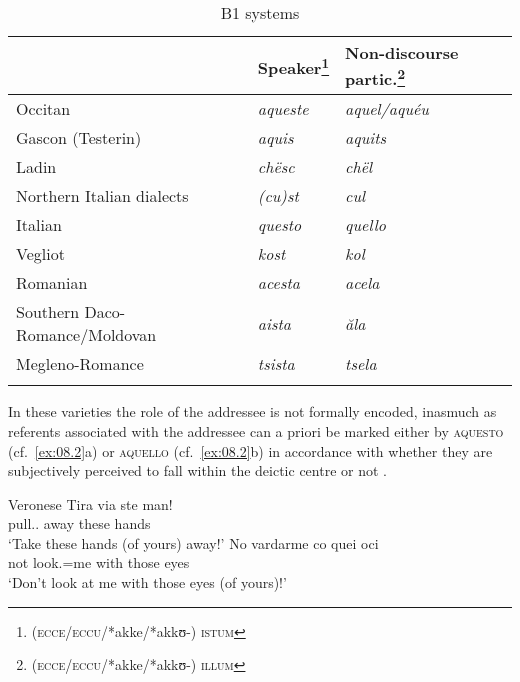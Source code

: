 \documentclass[output=paper]{langsci/langscibook}
\begin{document}
\begin{table}
    \caption{B1 systems}\label{tab:08.1}
        \begin{tabular}{lll}
\lsptoprule
   & Speaker\footnote{(\textsc{ecce}/\textsc{eccu}/*akke/*akkʊ-) \textsc{istum}}   & Non-discourse partic.\footnote{(\textsc{ecce}/\textsc{eccu}/*akke/*akkʊ-) \textsc{illum}} \\\midrule
Occitan                           & \emph{aqueste}                                            & \emph{aquel/aquéu}\\
Gascon (Testerin)                       & \emph{aquis}                                              & \emph{aquits}\\
Ladin                             & \emph{chësc}                                              & \emph{chël}\\
Northern Italian dialects         & \emph{(cu)st}                                             & \emph{cul}\\
Italian                           & \emph{questo}                                             & \emph{quello}\\
Vegliot                                 & \emph{kost}                                               & \emph{kol}\\
Romanian                          & \emph{acesta}                                             & \emph{acela}\\
Southern Daco-Romance\slash Moldovan & \emph{aista}                                              & \emph{ăla}\\
Megleno-Romance                         & \emph{tsista}                                             & \emph{tsela}\\
\lspbottomrule
        \end{tabular}
\end{table}

In these varieties the role of the addressee is not formally encoded, inasmuch
as referents associated with the addressee can a priori be marked either by
\textsc{aquesto} (cf.\ \ref{ex:08.2}a) or \textsc{aquello} (cf.\
\ref{ex:08.2}b) in accordance with whether they are subjectively
perceived to fall within the deictic centre or not
\citep[71--77]{Irsara:2009a}.

\ea Veronese\label{ex:08.2}
\ea
\gll   Tira  via  ste  man!\\
pull.\Imp{}.\Ssg{}  away  these  hands\\
\glt \enquote*{Take these hands (of yours) away!}
\ex
\gll   No  vardarme  co  quei  oci\\
not  look.\Inf{}=me  with  those  eyes\\
\glt \enquote*{Don’t look at me with those eyes (of yours)!}
\z
\z
\end{document}
